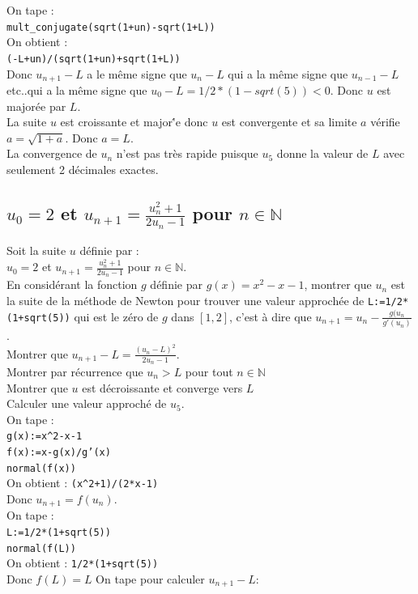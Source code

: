 \documentclass[a4paper,11pt]{book}
\newcommand{\N}{{\mathbb{N}}}
\begin{document}
On tape :\\
{\tt mult\_conjugate(sqrt(1+un)-sqrt(1+L))}\\
On obtient :\\
{\tt (-L+un)/(sqrt(1+un)+sqrt(1+L))}\\
Donc $u_{n+1}-L$ a le m\^eme signe que $u_n-L$ qui
a la m\^eme signe que $u_{n-1}-L$ etc..qui a la m\^eme signe que 
$u_0-L=1/2*(1-sqrt(5))<0$. Donc $u$ est major\'ee par $L$.\\
La suite $u$ est croissante et major\''e donc $u$ est convergente et sa limite 
$a$ v\'erifie $a=\sqrt{1+a}$. Donc $a=L$.\\
La  convergence de $u_n$ n'est pas tr\`es rapide puisque $u_5$ donne la 
valeur de $L$ avec seulement 2 d\'ecimales exactes.

\subsection{$u_0=2$ et $u_{n+1}=\frac{u_n^2+1}{2u_n-1}$ pour $n\in \N$} 
Soit la suite $u$ d\'efinie par :\\
$u_0=2$ et $u_{n+1}=\frac{u_n^2+1}{2u_n-1}$ pour $n\in \N$.\\
En consid\'erant la fonction $g$ d\'efinie par $g(x)=x^2-x-1$, montrer que 
$u_n$ est la suite de la m\'ethode de Newton pour trouver une valeur 
approch\'ee de {\tt L:=1/2*(1+sqrt(5))} qui est le z\'ero de $g$ dans
$[1,2]$, c'est \`a dire que $u_{n+1}=u_n-\frac{g(u_n}{g'(u_n)}$.\\
Montrer que $u_{n+1}-L=\frac{(u_n-L)^2}{2u_n-1}$.\\
Montrer par r\'ecurrence que $u_n>L$ pour tout $n\in \N$\\
Montrer que $u$ est d\'ecroissante et converge vers $L$\\
Calculer une valeur approch\'e de $u_5$.\\
On tape :\\
{\tt g(x):=x\verb|^|2-x-1}\\
{\tt f(x):=x-g(x)/g'(x)}\\
{\tt normal(f(x))}\\
On obtient :
{\tt  (x\verb|^|2+1)/(2*x-1)}\\
Donc $u_{n+1}=f(u_n)$.\\
On tape :\\
{\tt L:=1/2*(1+sqrt(5))}\\
{\tt normal(f(L))}\\
On obtient :
{\tt 1/2*(1+sqrt(5))}\\
Donc $f(L)=L$
On tape pour calculer $u_{n+1}-L$:\\
\end{document}
